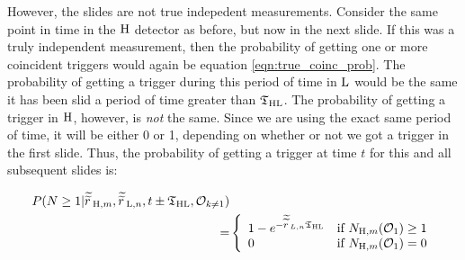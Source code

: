 However, the slides are not true indepedent measurements. Consider the same point in time in the $\mathrm{H}$ detector as before, but now in the next slide. If this was a truly independent measurement, then the probability of getting one or more coincident triggers would again be equation \ref{eqn:true_coinc_prob}. The probability of getting a trigger during this period of time in $\mathrm{L}$ would be the same it has been slid a period of time greater than $\mathfrak{T}_{\mathrm{H}\mathrm{L}}$. The probability of getting a trigger in $\mathrm{H}$, however, is \emph{not} the same. Since we are using the exact same period of time, it will be either 0 or 1, depending on whether or not we got a trigger in the first slide. Thus, the probability of getting a trigger at time $t$ for this and all subsequent slides is:

\begin{eqnarray}
P(N \geq 1|\widetilde{\widetilde{r}\,}_{\mathrm{H},m}, \widetilde{\widetilde{r}\,}_{\mathrm{L},n}, t \pm \mathfrak{T}_{\mathrm{H}\mathrm{L}}, \mathcal{O}_{k \neq 1}) &  \nonumber \\
 = & \left\{
\begin{array}{l l}
1 - e^{-\widetilde{\widetilde{r}\,}_{L,n}\mathfrak{T}_{\mathrm{H}\mathrm{L}}} & \mbox{if $N_{\mathrm{H},m}(\mathcal{O}_1) \geq 1$} \\
0 & \mbox{if $N_{\mathrm{H},m}(\mathcal{O}_1) = 0$}
\end{array}
\right.
\end{eqnarray}

\fi


\fi


